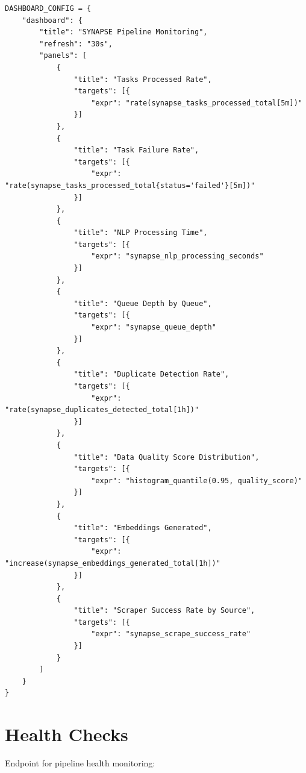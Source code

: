 \documentclass[12pt,a4paper]{report}
\begin{document}
\begin{lstlisting}
DASHBOARD_CONFIG = {
    "dashboard": {
        "title": "SYNAPSE Pipeline Monitoring",
        "refresh": "30s",
        "panels": [
            {
                "title": "Tasks Processed Rate",
                "targets": [{
                    "expr": "rate(synapse_tasks_processed_total[5m])"
                }]
            },
            {
                "title": "Task Failure Rate",
                "targets": [{
                    "expr": "rate(synapse_tasks_processed_total{status='failed'}[5m])"
                }]
            },
            {
                "title": "NLP Processing Time",
                "targets": [{
                    "expr": "synapse_nlp_processing_seconds"
                }]
            },
            {
                "title": "Queue Depth by Queue",
                "targets": [{
                    "expr": "synapse_queue_depth"
                }]
            },
            {
                "title": "Duplicate Detection Rate",
                "targets": [{
                    "expr": "rate(synapse_duplicates_detected_total[1h])"
                }]
            },
            {
                "title": "Data Quality Score Distribution",
                "targets": [{
                    "expr": "histogram_quantile(0.95, quality_score)"
                }]
            },
            {
                "title": "Embeddings Generated",
                "targets": [{
                    "expr": "increase(synapse_embeddings_generated_total[1h])"
                }]
            },
            {
                "title": "Scraper Success Rate by Source",
                "targets": [{
                    "expr": "synapse_scrape_success_rate"
                }]
            }
        ]
    }
}
\end{lstlisting}

\section{Health Checks}

Endpoint for pipeline health monitoring:
\end{document}
